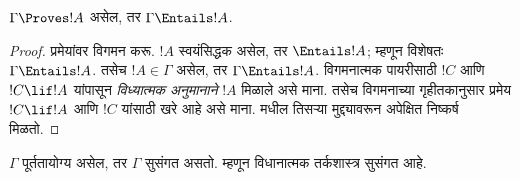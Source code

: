 \documentclass[../../../include/open-logic-section]{subfiles}
\begin{document}


\begin{thm}[निर्दोषता]
$\Gamma\Proves!A$ असेल, तर
$\Gamma \Entails !A$.
\end{thm}

\begin{proof}
प्रमेयांवर विगमन करू. $!A$ स्वयंसिद्धक असेल, तर $\Entails
!A$; म्हणून विशेषतः $\Gamma \Entails!A$. तसेच $!A \in \Gamma$
असेल, तर $\Gamma \Entails!A$. विगमनात्मक पायरीसाठी $!C$
आणि $!C\lif!A$ यांपासून \emph{विध्यात्मक अनुमानाने} $!A$
मिळाले असे माना. तसेच विगमनाच्या गृहीतकानुसार प्रमेय
$!C\lif !A$ आणि $!C$ यांसाठी खरे आहे असे माना.
 मधील तिसऱ्या मुद्द्यावरून
अपेक्षित निष्कर्ष मिळतो.
\end{proof}

\begin{cor}
$\Gamma$ पूर्ततायोग्य असेल, तर $\Gamma$ सुसंगत असतो. म्हणून
विधानात्मक तर्कशास्त्र सुसंगत आहे.
\end{cor}
\end{document}
